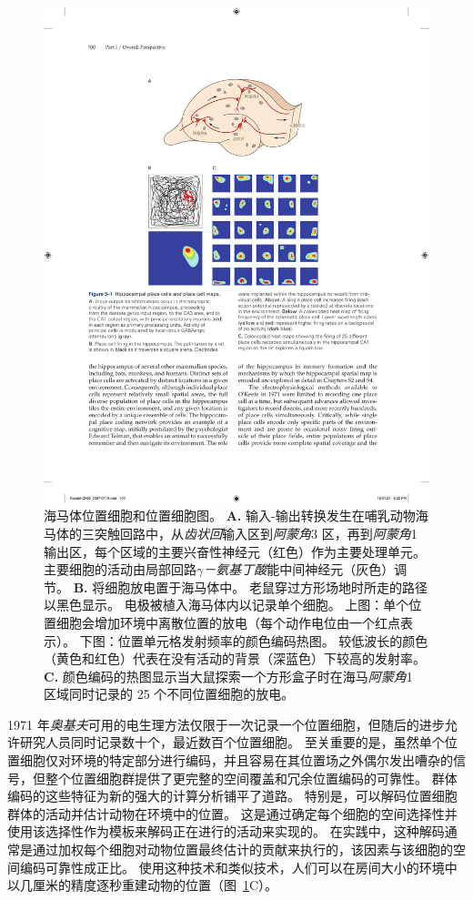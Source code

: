 \begin{figure}[htbp]
	\centering
	\includegraphics[width=0.9\linewidth]{chap05/fig_5_1}
	\caption{海马体位置细胞和位置细胞图。 
		\textbf{A.} 输入-输出转换发生在哺乳动物海马体的三突触回路中，从\textit{齿状回}输入区到\textit{阿蒙角}3 区，再到\textit{阿蒙角}1 输出区，每个区域的主要兴奋性神经元（红色）作为主要处理单元。
		主要细胞的活动由局部回路\textit{$\gamma$－氨基丁酸}能中间神经元（灰色）调节。
		\textbf{B.} 将细胞放电置于海马体中。
		老鼠穿过方形场地时所走的路径以黑色显示。
		电极被植入海马体内以记录单个细胞。
		上图：单个位置细胞会增加环境中离散位置的放电（每个动作电位由一个红点表示）。
		下图：位置单元格发射频率的颜色编码热图。
		较低波长的颜色（黄色和红色）代表在没有活动的背景（深蓝色）下较高的发射率。 
		\textbf{C.} 颜色编码的热图显示当大鼠探索一个方形盒子时在海马\textit{阿蒙角}1 区域同时记录的 25 个不同位置细胞的放电。}
	\label{fig:5_1}
\end{figure}


1971 年\textit{奥基夫}可用的电生理方法仅限于一次记录一个位置细胞，但随后的进步允许研究人员同时记录数十个，最近数百个位置细胞。
至关重要的是，虽然单个位置细胞仅对环境的特定部分进行编码，并且容易在其位置场之外偶尔发出嘈杂的信号，但整个位置细胞群提供了更完整的空间覆盖和冗余位置编码的可靠性。
群体编码的这些特征为新的强大的计算分析铺平了道路。
特别是，可以解码位置细胞群体的活动并估计动物在环境中的位置。
这是通过确定每个细胞的空间选择性并使用该选择性作为模板来解码正在进行的活动来实现的。
在实践中，这种解码通常是通过加权每个细胞对动物位置最终估计的贡献来执行的，该因素与该细胞的空间编码可靠性成正比。
使用这种技术和类似技术，人们可以在房间大小的环境中以几厘米的精度逐秒重建动物的位置（图~\ref{fig:5_1}C）。



